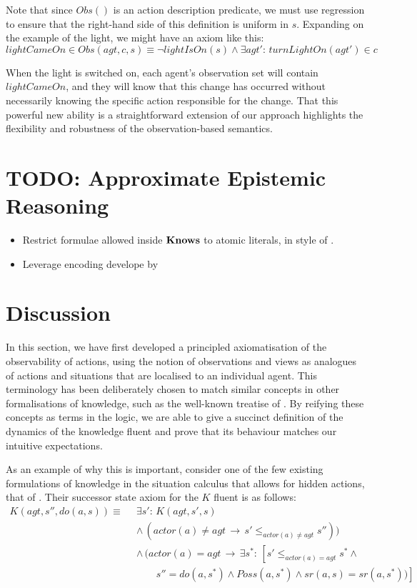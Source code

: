 Note that since $Obs()$ is an action description predicate, we must
use regression to ensure that the right-hand side of this definition
is uniform in $s$. Expanding on the example of the light, we might
have an axiom like this:\[
lightCameOn\in Obs(agt,c,s)\equiv\neg lightIsOn(s)\wedge\exists agt':\, turnLightOn(agt')\in c\]


When the light is switched on, each agent's observation set will contain
$lightCameOn$, and they will know that this change has occurred without
necessarily knowing the specific action responsible for the change.
That this powerful new ability is a straightforward extension of our
approach highlights the flexibility and robustness of the observation-based
semantics.


\section{TODO: Approximate Epistemic Reasoning}

\begin{itemize}
\item Restrict formulae allowed inside $\mathbf{Knows}$ to atomic literals, in
style of \citet{demolombe00tractable_sc_belief}. 
\item Leverage encoding develope by \citet{petrick02knowledge_equivalence} 
\end{itemize}

\section{Discussion}

In this section, we have first developed a principled axiomatisation
of the observability of actions, using the notion of observations
and views as analogues of actions and situations that are localised
to an individual agent. This terminology has been deliberately chosen
to match similar concepts in other formalisations of knowledge, such
as the well-known treatise of \citet{halpern90knowledge_distrib}.
By reifying these concepts as terms in the logic, we are able to give
a succinct definition of the dynamics of the knowledge fluent and
prove that its behaviour matches our intuitive expectations.

As an example of why this is important, consider one of the few existing
formulations of knowledge in the situation calculus that allows for
hidden actions, that of \citep{Lesperance99sitcalc_approach}. Their
successor state axiom for the $K$ fluent is as follows:\begin{align*}
K(agt,s'',do(a,s))\equiv\,\,\, & \exists s':\, K(agt,s',s)\\
 & \wedge\,(actor(a)\neq agt\,\rightarrow\, s'\leq_{actor(a)\neq agt}s''))\\
 & \wedge\,(actor(a)=agt\,\rightarrow\,\exists s^{*}:\,\left[s'\leq_{actor(a)=agt}s^{*}\wedge\right.\\
 & \,\,\,\,\,\,\,\,\,\,\,\,\left.s''=do(a,s^{*})\wedge Poss(a,s^{*})\wedge sr(a,s)=sr(a,s^{*}))\right]\end{align*}


